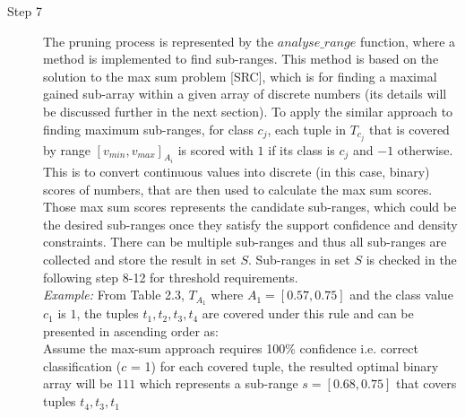 \begin{description}
\item[Step 7] The pruning process is represented by the $analyse\_range$ function, where a method is implemented to find sub-ranges. This method is based on the solution to the max sum problem [SRC], which is for finding a maximal gained sub-array within a given array of discrete numbers (its details will be discussed further in the next section). To apply the similar approach to finding maximum sub-ranges, for class $c_j$, each tuple in $T_{c_j}$ that is covered by range $[v_{min}, v_{max}]_{A_i}$ is scored with $1$ if its class is $c_j$ and $-1$ otherwise. This is to convert continuous values into discrete (in this case, binary) scores of numbers, that are then used to calculate the max sum scores. Those max sum scores represents the candidate sub-ranges, which could be the desired sub-ranges once they satisfy the support confidence and density constraints. There can be multiple sub-ranges and thus all sub-ranges are collected and store the result in set $S$. Sub-ranges in set $S$ is checked in the following step 8-12 for threshold requirements. \\
\textit{Example: } From Table 2.3, $T_{A_1}$ where $A_1 = [0.57, 0.75]$ and the class value $c_1$ is $1$, the tuples ${t_1,t_2,t_3,t_4}$ are covered under this rule and can be presented in ascending order as: \\


Assume the max-sum approach requires 100\% confidence i.e. correct classification ($c$ = 1) for each covered tuple, the resulted optimal binary array will be ${ 1 1 1 }$ which represents a sub-range $s = [0.68, 0.75]$ that covers tuples ${t_4,t_3,t_1}$ \\


\end{description}
